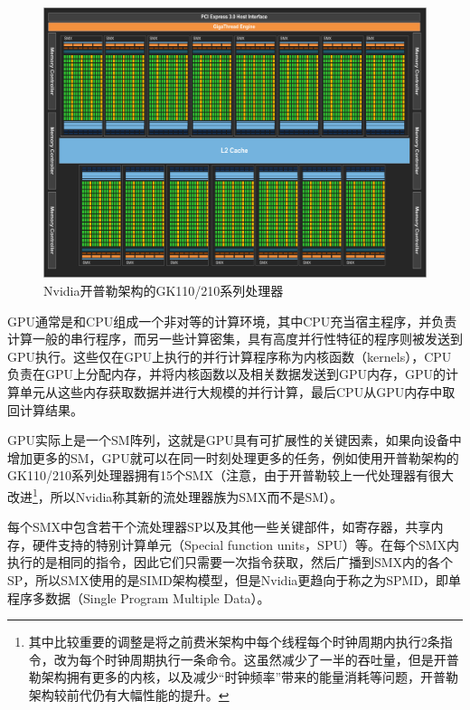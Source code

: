 \begin{figure}
	\begin{fullwidth}
		\includegraphics[width=1.0\thewidth]{figures/rp/kepler}
		\caption{Nvidia开普勒架构的GK110/210系列处理器}
		\label{f:rp-kepler}
	\end{fullwidth}
\end{figure}

GPU通常是和CPU组成一个非对等的计算环境，其中CPU充当宿主程序，并负责计算一般的串行程序，而另一些计算密集，具有高度并行性特征的程序则被发送到GPU执行。这些仅在GPU上执行的并行计算程序称为内核函数（kernels），CPU负责在GPU上分配内存，并将内核函数以及相关数据发送到GPU内存，GPU的计算单元从这些内存获取数据并进行大规模的并行计算，最后CPU从GPU内存中取回计算结果。

GPU实际上是一个SM阵列，这就是GPU具有可扩展性的关键因素，如果向设备中增加更多的SM，GPU就可以在同一时刻处理更多的任务，例如使用开普勒架构的GK110/210系列处理器拥有15个SMX（注意，由于开普勒较上一代处理器有很大改进\footnote{其中比较重要的调整是将之前费米架构中每个线程每个时钟周期内执行2条指令，改为每个时钟周期执行一条命令。这虽然减少了一半的吞吐量，但是开普勒架构拥有更多的内核，以及减少“时钟频率”带来的能量消耗等问题，开普勒架构较前代仍有大幅性能的提升。}，所以Nvidia称其新的流处理器族为SMX而不是SM）。

每个SMX中包含若干个流处理器SP以及其他一些关键部件，如寄存器，共享内存，硬件支持的特别计算单元（Special function units，SPU）等。在每个SMX内执行的是相同的指令，因此它们只需要一次指令获取，然后广播到SMX内的各个SP，所以SMX使用的是SIMD架构模型，但是Nvidia更趋向于称之为SPMD，即单程序多数据（Single Program Multiple Data）。

